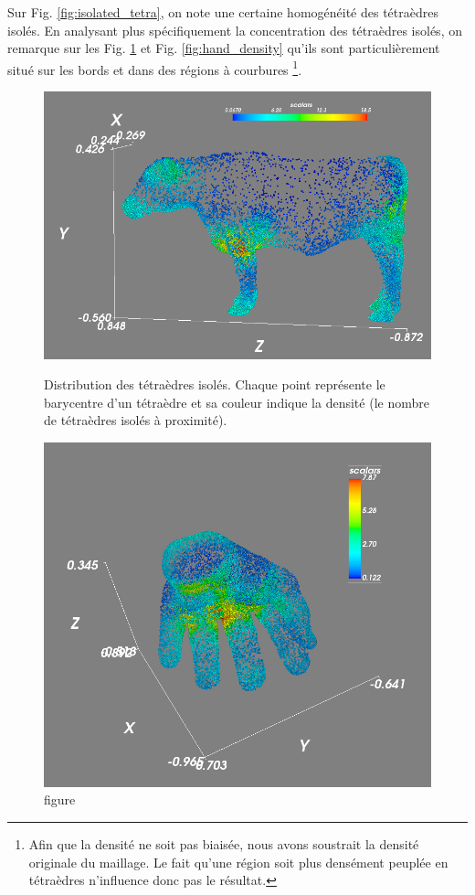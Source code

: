 \documentclass[a4paper,11pt,openany]{article}
\begin{document}
\noindent
Sur Fig. \ref{fig:isolated_tetra}, on note une certaine homogénéité des tétraèdres isolés. En analysant plus spécifiquement la concentration des tétraèdres isolés, on remarque sur les Fig. \ref{fig:density_cow} et Fig. \ref{fig:hand_density} qu'ils sont particulièrement situé sur les bords et dans des régions à courbures \footnote{Afin que la densité ne soit pas biaisée, nous avons soustrait la densité originale du maillage. Le fait qu'une région soit plus densément peuplée en tétraèdres n'influence donc pas le résultat.}.
\begin{figure}[H]
\centering
\begin{minipage}{.5\textwidth}
  \centering
  \includegraphics[scale=0.3]{Images/density_cow}
  \caption{figure}{Distribution des tétraèdres isolés. Chaque point représente le barycentre d'un tétraèdre et sa couleur indique la densité (le nombre de tétraèdres isolés à proximité).}
  \label{fig:density_cow}
\end{minipage}%
\begin{minipage}{.5\textwidth}
  \centering
  \includegraphics[scale=0.23]{Images/hand_density}

\end{minipage}
\end{figure}
\end{document}
